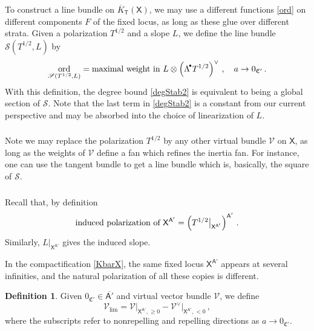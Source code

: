 \documentclass[14pt]{extarticle}
\newcommand{\bT}{\mathsf{T}}
\newcommand{\bA}{\mathsf{A}}
\newcommand{\bX}{\mathsf{X}}
\newcommand{\cV}{\mathscr{V}}
\newcommand{\fC}{\mathfrak{C}}
\newcommand{\cS}{\mathscr{S}}
\DeclareMathOperator{\ord}{ord}
\newcommand{\Ld}{{\Lambda}^{\!\raisebox{0.5mm}{$\scriptscriptstyle
      \bullet$}}\!}
\theoremstyle{definition}
\newtheorem{Definition}{Definition}
\newcommand{\Kbar}{\overline{K}}
\begin{document}
To construct a line bundle on $\Kbar_\bT(\bX)$, we may use a different
functions \eqref{ord} on different components $F$ of the fixed locus,
as long as these glue over different strata. Given a polarization $T^{1/2}$
and a slope $L$, we define the line bundle $\cS(T^{1/2},L)$ by 
$$
\ord_{\cS(T^{1/2},L)} =  \textup{maximal weight in } L \otimes \left( \Ld \,
  T^{1/2}  \right)^\vee \,,
\quad  a\to 0_{\fC'}  \,. 
$$
With this definition, the degree bound \eqref{degStab2}  is equivalent
to being a global section of $\cS$. 
Note that the last term in \eqref{degStab2} is a constant from our
current perspective and may be absorbed into the choice of linearization of
$L$.


\subsubsection{}\label{s_replace_polarization}

Note we may replace the polarization $T^{1/2}$ by any other virtual
bundle $\cV$ on $\bX$, as long as the weights of $\cV$ define a fan which
refines the inertia fan. For instance, one can use the tangent bundle
to get a line bundle which is, basically, the square of $\cS$.




\subsubsection{}

Recall that, by definition
%
\begin{equation}
  \label{inducedpo}
  \textup{induced polarization of $\bX^{\bA'}$} =
  \left(T^{1/2}\big|_{\bX^{\bA'}}\right)^{\bA'} \,. 
\end{equation}
%
Similarly, $L\big|_{\bX^{\bA'}}$ gives the induced slope.

In the compactification \eqref{KbarX}, the same fixed locus $\bX^{\bA'}$ appears at several
infinities, and the natural polarization
of all these copies is different. 

\begin{Definition}
  Given $0_{\fC'} \in \overline{\bA'}$ and virtual vector bundle
  $\cV$, 
  we define 
\begin{equation}
  \label{limitpo}
  \cV_{\lim}= \cV\big|_{\bX^{\bA'}, \ge 0} - \cV^\vee
  \big|_{\bX^{\bA'}, < 0}\,, 
\end{equation}
%
where the subscripts refer to nonrepelling and repelling directions as
$a\to 0_{\fC'}$. 
\end{Definition}
\end{document}
